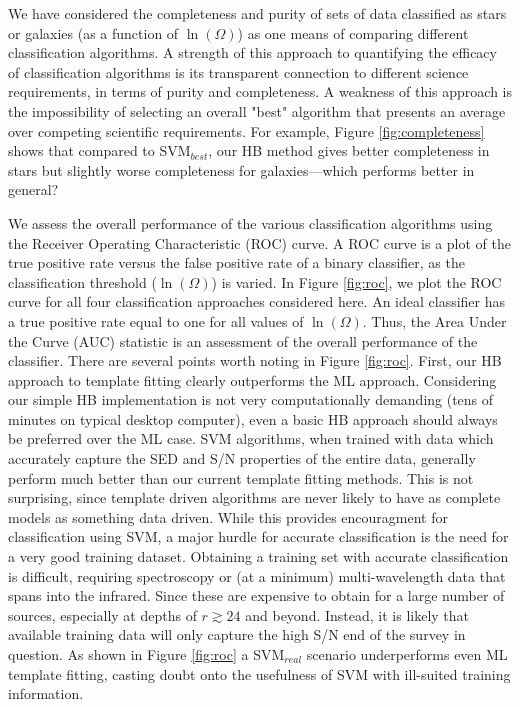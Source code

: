 \documentclass[12pt,preprint]{aastex}
\begin{document}
We have considered the completeness and purity of
sets of data classified as stars or galaxies (as a function of $\ln(\Omega)$) as one means of comparing different classification algorithms.  A strength of this approach to quantifying the efficacy of classification algorithms is its transparent connection to different science requirements, in terms of purity and completeness.  A weakness of this approach is the impossibility of selecting an overall "best" algorithm that presents an average over competing scientific requirements.
For example, Figure \ref{fig:completeness} shows that compared to
SVM$_{best}$, our HB method gives better completeness in stars but
slightly worse completeness for galaxies---which performs better in
general?

We assess the overall performance of the various classification
algorithms using the Receiver Operating Characteristic (ROC) curve.  A
ROC curve is a plot of the true positive rate versus the false
positive rate of a binary classifier, as the classification threshold
($\ln(\Omega)$) is varied.  In Figure \ref{fig:roc}, we plot the ROC
curve for all four classification approaches considered here.  An
ideal classifier has a true positive rate equal to one for all values
of $\ln(\Omega)$.  Thus, the Area Under the Curve (AUC) statistic is
an assessment of the overall performance of the classifier.  There are
several points worth noting in Figure \ref{fig:roc}.  First, our HB
approach to template fitting clearly outperforms the ML approach.
Considering our simple HB implementation is not very computationally
demanding (tens of minutes on typical desktop computer), even a basic
HB approach should always be preferred over the ML case.  SVM
algorithms, when trained with data which accurately capture the SED
and S/N properties of the entire data, generally perform much better
than our current template fitting methods.  This is not surprising,
since template driven algorithms are never likely to have as complete
models as something data driven.  While this provides encouragment for
classification using SVM, a major hurdle for accurate classification
is the need for a very good training dataset.  Obtaining a training
set with accurate classification is difficult, requiring spectroscopy
or (at a minimum) multi-wavelength data that spans into the infrared.
Since these are expensive to obtain for a large number of sources,
especially at depths of $r\gtrsim24$ and beyond.  Instead, it is
likely that available training data will only capture the high S/N end
of the survey in question.  As shown in Figure \ref{fig:roc} a
SVM$_{real}$ scenario underperforms even ML template fitting,
casting doubt onto the usefulness of SVM with ill-suited training
information.
\end{document}
